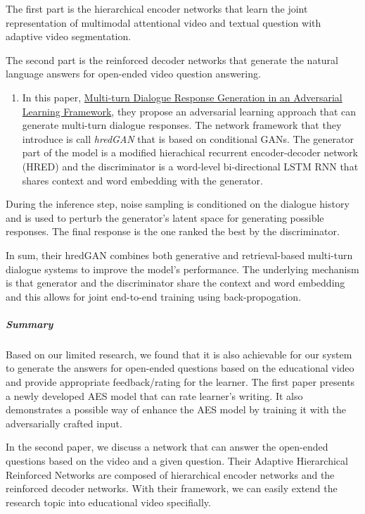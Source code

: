 \documentclass[]{book}
\providecommand{\tightlist}{%
  \setlength{\itemsep}{0pt}\setlength{\parskip}{0pt}}
\let\oldsubparagraph\subparagraph
\renewcommand{\subparagraph}[1]{\oldsubparagraph{#1}\mbox{}}
\theoremstyle{definition}
\theoremstyle{definition}
\theoremstyle{definition}
\theoremstyle{remark}
\begin{document}
The first part is the hierarchical encoder networks that learn the joint
representation of multimodal attentional video and textual question with
adaptive video segmentation.

The second part is the reinforced decoder networks that generate the
natural language answers for open-ended video question answering.

\begin{enumerate}
\def\labelenumi{\arabic{enumi}.}
\setcounter{enumi}{2}
\tightlist
\item
  In this paper, \href{https://arxiv.org/pdf/1805.11752.pdf}{Multi-turn
  Dialogue Response Generation in an Adversarial Learning Framework},
  they propose an adversarial learning approach that can generate
  multi-turn dialogue responses. The network framework that they
  introduce is call \emph{hredGAN} that is based on conditional GANs.
  The generator part of the model is a modified hierachical recurrent
  encoder-decoder network (HRED) and the discriminator is a word-level
  bi-directional LSTM RNN that shares context and word embedding with
  the generator.
\end{enumerate}

During the inference step, noise sampling is conditioned on the dialogue
history and is used to perturb the generator's latent space for
generating possible responses. The final response is the one ranked the
best by the discriminator.

In sum, their hredGAN combines both generative and retrieval-based
multi-turn dialogue systems to improve the model's performance. The
underlying mechanism is that generator and the discriminator share the
context and word embedding and this allows for joint end-to-end training
using back-propogation.

\subparagraph{Summary}\label{summary-2}

Based on our limited research, we found that it is also achievable for
our system to generate the answers for open-ended questions based on the
educational video and provide appropriate feedback/rating for the
learner. The first paper presents a newly developed AES model that can
rate learner's writing. It also demonstrates a possible way of enhance
the AES model by training it with the adversarially crafted input.

In the second paper, we discuss a network that can answer the open-ended
questions based on the video and a given question. Their Adaptive
Hierarchical Reinforced Networks are composed of hierarchical encoder
networks and the reinforced decoder networks. With their framework, we
can easily extend the research topic into educational video specifially.
\end{document}
